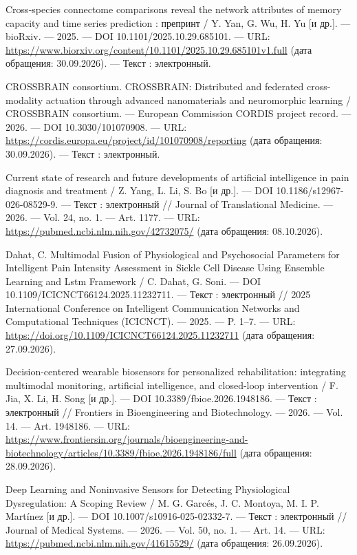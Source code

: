 \begin{list}{}{\setlength{\leftmargin}{10mm}\setlength{\labelwidth}{8mm}\setlength{\labelsep}{2mm}\setlength{\itemsep}{0pt}\setlength{\parsep}{0pt}\setlength{\topsep}{0pt}}
\item[77.] Cross-species connectome comparisons reveal the network attributes of memory capacity and time series prediction : препринт / Y. Yan, G. Wu, H. Yu [и др.]. — bioRxiv. — 2025. — DOI 10.1101/2025.10.29.685101. — URL: \url{https://www.biorxiv.org/content/10.1101/2025.10.29.685101v1.full} (дата обращения: 30.09.2026). — Текст : электронный.
\item[78.] CROSSBRAIN consortium. CROSSBRAIN: Distributed and federated cross-modality actuation through advanced nanomaterials and neuromorphic learning / CROSSBRAIN consortium. — European Commission CORDIS project record. — 2026. — DOI 10.3030/101070908. — URL: \url{https://cordis.europa.eu/project/id/101070908/reporting} (дата обращения: 30.09.2026). — Текст : электронный.
\item[79.] Current state of research and future developments of artificial intelligence in pain diagnosis and treatment / Z. Yang, L. Li, S. Bo [и др.]. — DOI 10.1186/s12967-026-08529-9. — Текст : электронный // Journal of Translational Medicine. — 2026. — Vol. 24, no. 1. — Art. 1177. — URL: \url{https://pubmed.ncbi.nlm.nih.gov/42732075/} (дата обращения: 08.10.2026).
\item[80.] Dahat, C. Multimodal Fusion of Physiological and Psychosocial Parameters for Intelligent Pain Intensity Assessment in Sickle Cell Disease Using Ensemble Learning and Lstm Framework / C. Dahat, G. Soni. — DOI 10.1109/ICICNCT66124.2025.11232711. — Текст : электронный // 2025 International Conference on Intelligent Communication Networks and Computational Techniques (ICICNCT). — 2025. — P. 1–7. — URL: \url{https://doi.org/10.1109/ICICNCT66124.2025.11232711} (дата обращения: 27.09.2026).
\item[81.] Decision-centered wearable biosensors for personalized rehabilitation: integrating multimodal monitoring, artificial intelligence, and closed-loop intervention / F. Jia, X. Li, H. Song [и др.]. — DOI 10.3389/fbioe.2026.1948186. — Текст : электронный // Frontiers in Bioengineering and Biotechnology. — 2026. — Vol. 14. — Art. 1948186. — URL: \url{https://www.frontiersin.org/journals/bioengineering-and-biotechnology/articles/10.3389/fbioe.2026.1948186/full} (дата обращения: 28.09.2026).
\item[82.] Deep Learning and Noninvasive Sensors for Detecting Physiological Dysregulation: A Scoping Review / M. G. Garcés, J. C. Montoya, M. I. P. Martínez [и др.]. — DOI 10.1007/s10916-025-02332-7. — Текст : электронный // Journal of Medical Systems. — 2026. — Vol. 50, no. 1. — Art. 14. — URL: \url{https://pubmed.ncbi.nlm.nih.gov/41615529/} (дата обращения: 26.09.2026).

\end{list}
